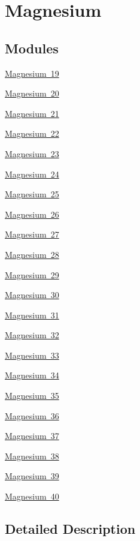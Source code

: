 \hypertarget{group___isotope_const-_magnesium}{}\section{Magnesium}
\label{group___isotope_const-_magnesium}
\subsection*{Modules}
\begin{DoxyCompactItemize}
\item 
\mbox{\hyperlink{group___isotope_const-_magnesium-_mg19}{Magnesium 19}}
\item 
\mbox{\hyperlink{group___isotope_const-_magnesium-_mg20}{Magnesium 20}}
\item 
\mbox{\hyperlink{group___isotope_const-_magnesium-_mg21}{Magnesium 21}}
\item 
\mbox{\hyperlink{group___isotope_const-_magnesium-_mg22}{Magnesium 22}}
\item 
\mbox{\hyperlink{group___isotope_const-_magnesium-_mg23}{Magnesium 23}}
\item 
\mbox{\hyperlink{group___isotope_const-_magnesium-_mg24}{Magnesium 24}}
\item 
\mbox{\hyperlink{group___isotope_const-_magnesium-_mg25}{Magnesium 25}}
\item 
\mbox{\hyperlink{group___isotope_const-_magnesium-_mg26}{Magnesium 26}}
\item 
\mbox{\hyperlink{group___isotope_const-_magnesium-_mg27}{Magnesium 27}}
\item 
\mbox{\hyperlink{group___isotope_const-_magnesium-_mg28}{Magnesium 28}}
\item 
\mbox{\hyperlink{group___isotope_const-_magnesium-_mg29}{Magnesium 29}}
\item 
\mbox{\hyperlink{group___isotope_const-_magnesium-_mg30}{Magnesium 30}}
\item 
\mbox{\hyperlink{group___isotope_const-_magnesium-_mg31}{Magnesium 31}}
\item 
\mbox{\hyperlink{group___isotope_const-_magnesium-_mg32}{Magnesium 32}}
\item 
\mbox{\hyperlink{group___isotope_const-_magnesium-_mg33}{Magnesium 33}}
\item 
\mbox{\hyperlink{group___isotope_const-_magnesium-_mg34}{Magnesium 34}}
\item 
\mbox{\hyperlink{group___isotope_const-_magnesium-_mg35}{Magnesium 35}}
\item 
\mbox{\hyperlink{group___isotope_const-_magnesium-_mg36}{Magnesium 36}}
\item 
\mbox{\hyperlink{group___isotope_const-_magnesium-_mg37}{Magnesium 37}}
\item 
\mbox{\hyperlink{group___isotope_const-_magnesium-_mg38}{Magnesium 38}}
\item 
\mbox{\hyperlink{group___isotope_const-_magnesium-_mg39}{Magnesium 39}}
\item 
\mbox{\hyperlink{group___isotope_const-_magnesium-_mg40}{Magnesium 40}}
\end{DoxyCompactItemize}


\subsection{Detailed Description}
